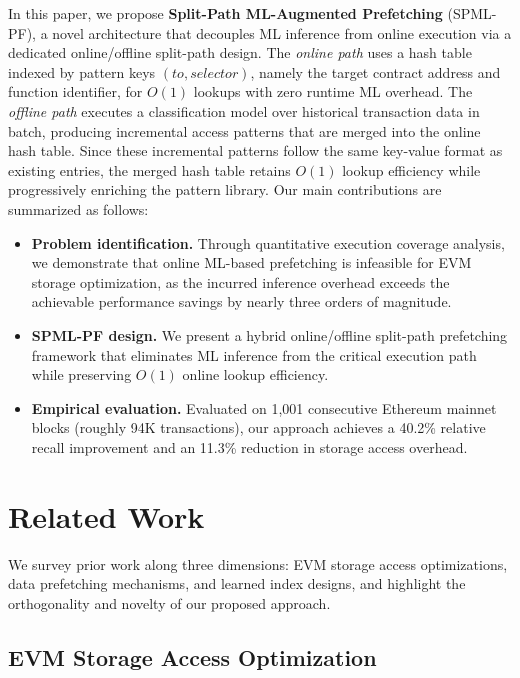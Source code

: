 \documentclass[conference]{IEEEtran}
\begin{document}
In this paper, we propose \textbf{Split-Path ML-Augmented Prefetching} (SPML-PF), a novel architecture that decouples ML inference from online execution via a dedicated online/offline split-path design. The \emph{online path} uses a hash table indexed by pattern keys $(to, selector)$, namely the target contract address and function identifier, for $O(1)$ lookups with zero runtime ML overhead. The \emph{offline path} executes a classification model over historical transaction data in batch, producing incremental access patterns that are merged into the online hash table. Since these incremental patterns follow the same key-value format as existing entries, the merged hash table retains $O(1)$ lookup efficiency while progressively enriching the pattern library. Our main contributions are summarized as follows:
\begin{itemize}
    \item \textbf{Problem identification.} Through quantitative execution coverage analysis, we demonstrate that online ML-based prefetching is infeasible for EVM storage optimization, as the incurred inference overhead exceeds the achievable performance savings by nearly three orders of magnitude.
    \item \textbf{SPML-PF design.} We present a hybrid online/offline split-path prefetching framework that eliminates ML inference from the critical execution path while preserving $O(1)$ online lookup efficiency.
    \item \textbf{Empirical evaluation.} Evaluated on 1,001 consecutive Ethereum mainnet blocks (roughly 94K transactions), our approach achieves a 40.2\% relative recall improvement and an 11.3\% reduction in storage access overhead.
\end{itemize}

\section{Related Work}
\label{sec:related-work}

We survey prior work along three dimensions: EVM storage access optimizations, data prefetching mechanisms, and learned index designs, and highlight the orthogonality and novelty of our proposed approach.

\subsection{EVM Storage Access Optimization}
\label{sec:evm-storage-opt}
\end{document}
